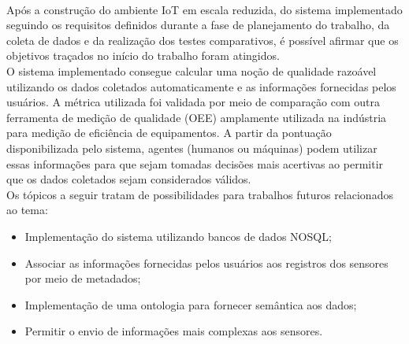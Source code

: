 \\\null \quad Após a construção do ambiente \acrshort{IoT} em escala reduzida, do sistema implementado seguindo os requisitos definidos durante a fase de planejamento do trabalho, da coleta de dados e da realização dos testes comparativos, é possível afirmar que os objetivos traçados no início do trabalho foram atingidos.
\\\null \quad O sistema implementado consegue calcular uma noção de qualidade razoável utilizando os dados coletados automaticamente e as informações fornecidas pelos usuários. A métrica utilizada foi validada por meio de comparação com outra ferramenta de medição de qualidade (\acrshort{OEE}) amplamente utilizada na indústria para medição de eficiência de equipamentos. A partir da pontuação disponibilizada pelo sistema, agentes (humanos ou máquinas) podem utilizar essas informações para que sejam tomadas decisões mais acertivas ao permitir que os dados coletados sejam considerados válidos.
\\\null \quad Os tópicos a seguir tratam de possibilidades para trabalhos futuros relacionados ao tema:
\begin{itemize}
  \item Implementação do sistema utilizando bancos de dados NOSQL;
  \item Associar as informações fornecidas pelos usuários aos registros dos sensores por meio de metadados;
  \item Implementação de uma ontologia para fornecer semântica aos dados;
  \item Permitir o envio de informações mais complexas aos sensores.
\end{itemize}
